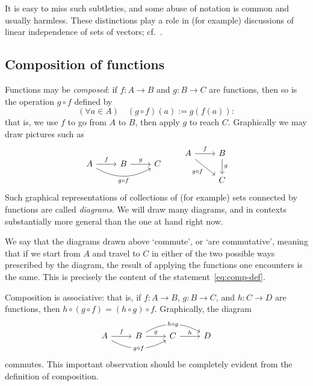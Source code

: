 It is easy to miss such subtleties, and some abuse of notation is
common and usually harmless. These distinctions play a role in (for
example) discussions of linear independence of sets of vectors;
cf.~.

\subsection{Composition of functions}%
\label{subsec:prelims:composition-of-functions}
Functions may be \emph{composed}: if $f : A \to B$
and $g : B \to C$ are functions, then so is the operation $g \circ f$
defined by
\begin{equation}
  \label{eq:comp-def}
  (\forall a \in A)\quad (g \circ f)(a) := g(f(a)) :
\end{equation}
that is, we use $f$ to go from $A$ to $B$, then apply $g$ to reach
$C$.  Graphically we may draw pictures such as
\[
  \begin{tikzcd}
    A \arrow[r, "f"] \arrow[rr, bend right, "g \circ f"'] & B
    \arrow[r, "g"] & C
  \end{tikzcd}
  \qquad
  \begin{tikzcd}
    A \arrow[r,"f"] \arrow[rd,"g \circ f"'] & B \arrow[d,"g"]\\
    & C
  \end{tikzcd}
\]
Such graphical representations of collections of (for example) sets
connected by functions are called \emph{diagrams}. We will draw many
diagrams, and in contexts substantially more general than the one at
hand right now.

We say that the diagrams drawn above `commute', or `are commutative',
meaning that if we start from $A$ and travel to $C$ in either of the
two possible ways prescribed by the diagram, the result of applying
the functions one encounters is the same. This is precisely the
content of the statement~\eqref{eq:comp-def}.

Composition is associative: that is, if $f : A \to B$, $g : B \to C$,
and $h : C \to D$ are functions, then
$h \circ (g \circ f) = (h \circ g) \circ f$. Graphically, the diagram
\[
  \begin{tikzcd}
    A \arrow[r,"f"] \arrow[rr,bend right, "g\circ f" description] & B
    \arrow[r,"g"] \arrow[rr,bend left, "h\circ g" description] & C
    \arrow[r,"h"] & D
  \end{tikzcd}
\]
commutes. This important observation should be completely evident from
the definition of composition.

